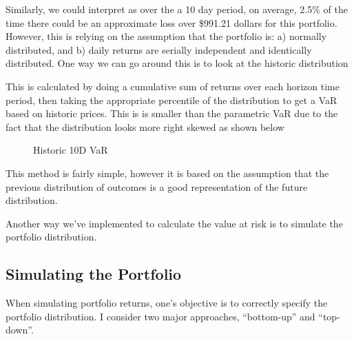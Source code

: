 \documentclass[letterpaper,10pt,english]{sphinxmanual}
\begin{document}
Similarly, we could interpret as over the a 10 day period, on average,
2.5\% of the time there could be an approximate loss over \$991.21 dollars
for this portfolio. However, this is relying on the assumption that the
portfolio is: a) normally distributed, and b) daily returns are serially
independent and identically distributed. One way we can go around this
is to look at the historic distribution

%
\begin{sphinxVerbatim}[commandchars=\\\{\}]
   
\end{sphinxVerbatim}

This is calculated by doing a cumulative sum of returns over each
horizon time period, then taking the appropriate percentile of the
distribution to get a VaR based on historic prices. This is is smaller
than the parametric VaR due to the fact that the distribution looks more
right skewed as shown below

\begin{figure}[htbp]
\centering
\capstart

\noindent{}
\caption{Historic 10D VaR}\label{\detokenize{gettingstarted:id3}}\end{figure}

This method is fairly simple, however it is based on the assumption that
the previous distribution of outcomes is a good representation of the
future distribution.

Another way we’ve implemented to calculate the value at risk is to
simulate the portfolio distribution.


\subsection{Simulating the Portfolio}
\label{\detokenize{gettingstarted:simulating-the-portfolio}}
When simulating portfolio returns, one’s objective is to correctly
specify the portfolio distribution. I consider two major approaches,
“bottom-up” and “top-down”.
\end{document}
